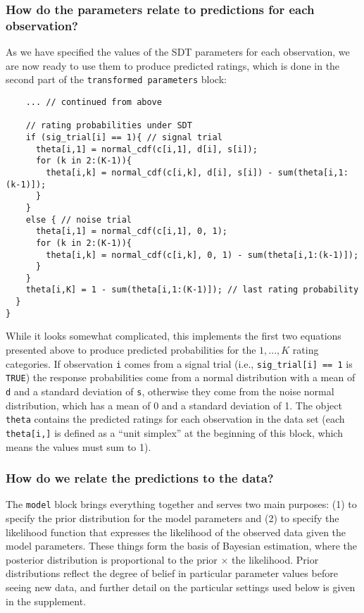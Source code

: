 \documentclass[
  english,
  ,man,floatsintext]{apa6}
\begin{document}
\hypertarget{how-do-the-parameters-relate-to-predictions-for-each-observation}{%
\subsubsection{How do the parameters relate to predictions for each observation?}\label{how-do-the-parameters-relate-to-predictions-for-each-observation}}

As we have specified the values of the SDT parameters for each observation, we are now ready to use them to produce predicted ratings, which is done in the second part of the \texttt{transformed\ parameters} block:

\begin{verbatim}
    ... // continued from above

    // rating probabilities under SDT
    if (sig_trial[i] == 1){ // signal trial
      theta[i,1] = normal_cdf(c[i,1], d[i], s[i]);
      for (k in 2:(K-1)){
        theta[i,k] = normal_cdf(c[i,k], d[i], s[i]) - sum(theta[i,1:(k-1)]);
      }
    }
    else { // noise trial
      theta[i,1] = normal_cdf(c[i,1], 0, 1);
      for (k in 2:(K-1)){
        theta[i,k] = normal_cdf(c[i,k], 0, 1) - sum(theta[i,1:(k-1)]);
      }
    }
    theta[i,K] = 1 - sum(theta[i,1:(K-1)]); // last rating probability 
  }
}
\end{verbatim}

While it looks somewhat complicated, this implements the first two equations presented above to produce predicted probabilities for the \(1,...,K\) rating categories. If observation \texttt{i} comes from a signal trial (i.e., \texttt{sig\_trial{[}i{]}\ ==\ 1} is \texttt{TRUE}) the response probabilities come from a normal distribution with a mean of \texttt{d} and a standard deviation of \texttt{s}, otherwise they come from the noise normal distribution, which has a mean of 0 and a standard deviation of 1. The object \texttt{theta} contains the predicted ratings for each observation in the data set (each \texttt{theta{[}i,{]}} is defined as a \enquote{unit simplex} at the beginning of this block, which means the values must sum to 1).

\hypertarget{how-do-we-relate-the-predictions-to-the-data}{%
\subsubsection{How do we relate the predictions to the data?}\label{how-do-we-relate-the-predictions-to-the-data}}

The \texttt{model} block brings everything together and serves two main purposes: (1) to specify the prior distribution for the model parameters and (2) to specify the likelihood function that expresses the likelihood of the observed data given the model parameters. These things form the basis of Bayesian estimation, where the posterior distribution is proportional to the prior \(\times\) the likelihood. Prior distributions reflect the degree of belief in particular parameter values before seeing new data, and further detail on the particular settings used below is given in the supplement.
\end{document}
